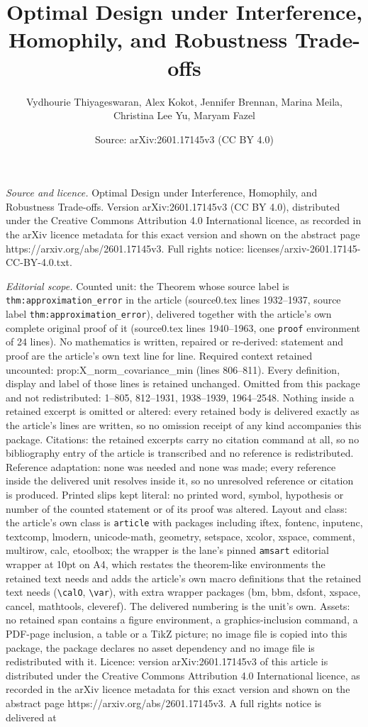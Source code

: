 \documentclass[10pt,a4paper]{amsart}
\title[Optimal Design under Interference, Homophily, and Robustness]{Optimal Design under Interference, Homophily, and Robustness Trade-offs}
\author{Vydhourie Thiyageswaran, Alex Kokot, Jennifer Brennan, Marina Meila, Christina Lee Yu, Maryam Fazel}
\date{Source: arXiv:2601.17145v3 (CC BY 4.0)}
\begin{document}
\maketitle

\noindent\emph{Source and licence.} Optimal Design under Interference, Homophily, and Robustness Trade-offs. Version arXiv:2601.17145v3 (CC BY 4.0), distributed under the Creative Commons Attribution 4.0 International licence, as recorded in the arXiv licence metadata for this exact version and shown on the abstract page https://arxiv.org/abs/2601.17145v3. Full rights notice: licenses/arxiv-2601.17145-CC-BY-4.0.txt.\par\smallskip

\noindent\textit{Editorial scope.} Counted unit: the Theorem whose source label is \texttt{thm:approximation\_error} in the article (source0.tex lines 1932--1937, source label \texttt{thm:approximation\_error}), delivered together with the article's own complete original proof of it (source0.tex lines 1940--1963, one \texttt{proof} environment of 24 lines). No mathematics is written, repaired or re-derived: statement and proof are the article's own text line for line. Required context retained uncounted: prop:X\_norm\_covariance\_min (lines 806--811). Every definition, display and label of those lines is retained unchanged. Omitted from this package and not redistributed: 1--805, 812--1931, 1938--1939, 1964--2548. Nothing inside a retained excerpt is omitted or altered: every retained body is delivered exactly as the article's lines are written, so no omission receipt of any kind accompanies this package. Citations: the retained excerpts carry no citation command at all, so no bibliography entry of the article is transcribed and no reference is redistributed. Reference adaptation: none was needed and none was made; every reference inside the delivered unit resolves inside it, so no unresolved reference or citation is produced. Printed slips kept literal: no printed word, symbol, hypothesis or number of the counted statement or of its proof was altered. Layout and class: the article's own class is \texttt{article} with packages including iftex, fontenc, inputenc, textcomp, lmodern, unicode-math, geometry, setspace, xcolor, xspace, comment, multirow, calc, etoolbox; the wrapper is the lane's pinned \texttt{amsart} editorial wrapper at 10pt on A4, which restates the theorem-like environments the retained text needs and adds the article's own macro definitions that the retained text needs (\texttt{\textbackslash calO}, \texttt{\textbackslash var}), with extra wrapper packages (bm, bbm, dsfont, xspace, cancel, mathtools, cleveref). The delivered numbering is the unit's own. Assets: no retained span contains a figure environment, a graphics-inclusion command, a PDF-page inclusion, a table or a TikZ picture; no image file is copied into this package, the package declares no asset dependency and no image file is redistributed with it. Licence: version arXiv:2601.17145v3 of this article is distributed under the Creative Commons Attribution 4.0 International licence, as recorded in the arXiv licence metadata for this exact version and shown on the abstract page https://arxiv.org/abs/2601.17145v3. A full rights notice is delivered at 
\end{document}
